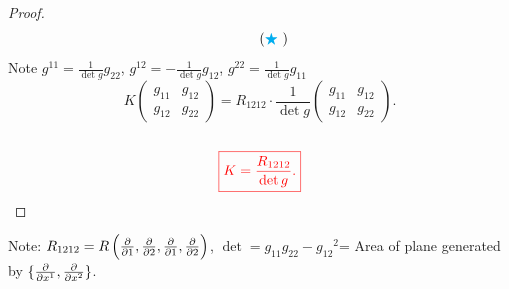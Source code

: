 \begin{proof}
\[        \tag{\(\textcolor{cyan}{\bigstar}\) }
    \]
    Note \(g^{11}=\frac{1}{\det g}g_{22}\), \(g^{12}=-\frac{1}{\det g}
    g_{12}\), \(g^{22}=\frac{1}{\det g}g_{11}\)
    \[
        K\begin{pmatrix}
            g_{11}& g_{12}\\
            g_{12} & g_{22}
        \end{pmatrix}
        =R_{1212}\cdot\frac{1}{\det g}
        \begin{pmatrix}
            g_{11}& g_{12}\\
            g_{12} & g_{22}
        \end{pmatrix}.
    \]
    \ie\ 
    \[
        \textcolor{red}{
            \boxed{K=\frac{R_{1212}}{\det g}.}
        }    
    \]
\end{proof}
Note: \(R_{1212}=R\left(\pdv{1},\pdv{2},\pdv{1},\pdv{2}\right)\), 
\(\det= g_{11}g_{22}-{g_{12}}^2\)= Area of plane generated by
\(\{\pdv{x^1},\pdv{x^2}\}\).

